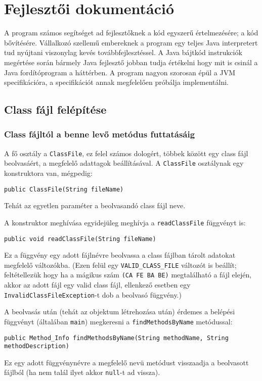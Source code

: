 \chapter{Fejlesztői dokumentáció}
\label{ch:impl}

A program számos segítséget ad fejlesztőknek a kód egyszerű értelmezésére; a kód bővítésére. Vállalkozó szellemű embereknek a program egy teljes Java interpretert tud nyújtani viszonylag kevés továbbfejlesztéssel. A Java bájtkód instrukciók megértése során bármely Java fejlesztő jobban tudja értékelni hogy mit is csinál a Java fordítóprogram a háttérben. A program nagyon szorosan épül a JVM specifikációra, a specifikációt annak megfelelően próbálja implementálni.

\section{Class fájl felépítése}

\subsection{Class fájltól a benne levő metódus futtatásáig}

A fő osztály a \lstinline{ClassFile}, ez felel számos dologért, többek között egy class fájl beolvasáért, a megfelelő adattagok beállításával. A \lstinline{ClassFile} osztálynak egy konstruktora van, mégpedig:
\begin{verbatim}
public ClassFile(String fileName)
\end{verbatim}
Tehát az egyetlen paraméter a beolvasandó class fájl neve.

A konstruktor meghívása egyidejüleg meghívja a \lstinline{readClassFile} függvényt is:
\begin{verbatim}
public void readClassFile(String fileName)
\end{verbatim}
Ez a függvény egy adott fájlnévre beolvassa a class fájlban tárolt adatokat megfelelő változókba.
(Ezen felül egy \lstinline{VALID_CLASS_FILE} változót is beállít; feltétellezük hogy ha a mágikus szám \lstinline{(CA FE BA BE)} megtalálható a fájl elején, akkor az adott fájl egy valid class fájl, ellenkező esetben egy \lstinline{InvalidClassFileException}-t dob a beolvasó függvény.)

A beolvasás után (tehát az objektum létrehozása után) érdemes a belépési függvényt (általában \lstinline{main}) megkeresni a \lstinline{findMethodsByName} metódussal:
\begin{verbatim}
public Method_Info findMethodsByName(String methodName, String methodDescription)
\end{verbatim}
Ez egy adott függvénynévre a megfelelő nevü metódust visszaadja a beolvasott fájlból (ha nem talál ilyet akkor \lstinline{null}-t ad vissza). 


